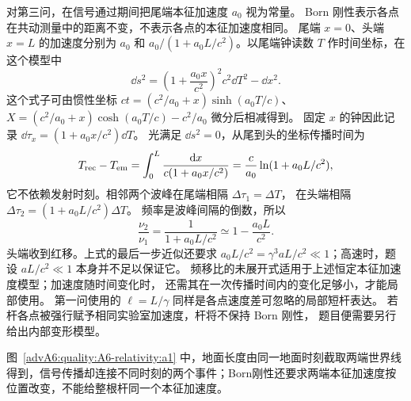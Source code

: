 \begin{advsolution}
对第三问，在信号通过期间把尾端本征加速度 $a_0$ 视为常量。
Born 刚性表示各点在共动测量中的距离不变，不表示各点的本征加速度相同。
尾端 $x=0$、头端 $x=L$ 的加速度分别为 $a_0$ 和
$a_0/(1+a_0L/c^2)$。以尾端钟读数 $T$ 作时间坐标，在这个模型中
\[
 \dd s^2=
 \left(1+\frac{a_0x}{c^2}\right)^2c^2\dd T^2-\dd x^2.
\]
这个式子可由惯性坐标
$ct=(c^2/a_0+x)\sinh(a_0T/c)$、
$X=(c^2/a_0+x)\cosh(a_0T/c)-c^2/a_0$ 微分后相减得到。
固定 $x$ 的钟因此记录 $\dd\tau_x=(1+a_0x/c^2)\dd T$。
光满足 $\dd s^2=0$，从尾到头的坐标传播时间为
\[
 T_{\rm rec}-T_{\rm em}=\int_0^L\frac{\mathop{}\!\mathrm d x}{c(1+a_0x/c^2)}
 =\frac c{a_0}\ln(1+a_0L/c^2),
\]
它不依赖发射时刻。相邻两个波峰在尾端相隔 $\Delta\tau_1=\Delta T$，
在头端相隔 $\Delta\tau_2=(1+a_0L/c^2)\Delta T$。
频率是波峰间隔的倒数，所以
\[
 \boxed{\frac{\nu_2}{\nu_1}
 =\frac1{1+a_0L/c^2}
 \simeq1-\frac{a_0L}{c^2}}.
\]
头端收到红移。上式的最后一步近似还要求
$a_0L/c^2=\gamma^3aL/c^2\ll1$；高速时，题设 $aL/c^2\ll1$ 本身并不足以保证它。
频移比的未展开式适用于上述恒定本征加速度模型；加速度随时间变化时，
还需其在一次传播时间内的变化足够小，才能局部使用。
第一问使用的 $\ell=L/\gamma$ 同样是各点速度差可忽略的局部短杆表达。
若杆各点被强行赋予相同实验室加速度，杆将不保持 Born 刚性，
题目便需要另行给出内部变形模型。

图~\ref{advA6:quality:A6-relativity:a1} 中，地面长度由同一地面时刻截取两端世界线得到，信号传播却连接不同时刻的两个事件；Born刚性还要求两端本征加速度按位置改变，不能给整根杆同一个本征加速度。
\end{advsolution}

